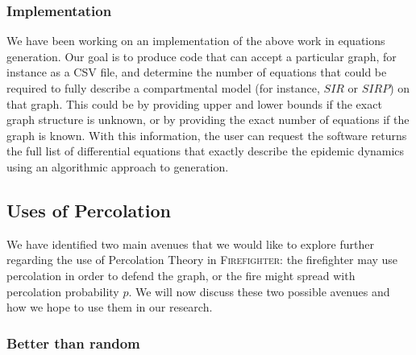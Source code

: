 \documentclass[../report.tex]{subfiles}
\begin{document}
\subsubsection{Implementation}
\label{subsubsec:implementation}

We have been working on an implementation of the above work in equations generation. Our goal is to produce code that can accept a particular graph, for instance as a CSV file, and determine the number of equations that could be required to fully describe a compartmental model (for instance, $SIR$ or $SIRP$) on that graph. This could be by providing upper and lower bounds if the exact graph structure is unknown, or by providing the exact number of equations if the graph is known. With this information, the user can request the software returns the full list of differential equations that exactly describe the epidemic dynamics using an algorithmic approach to generation.

\subsection{Uses of Percolation}
\label{subsec:perc-fire}

We have identified two main avenues that we would like to explore further regarding the use of Percolation Theory in {\scshape Firefighter}: the firefighter may use percolation in order to defend the graph, or the fire might spread with percolation probability $p$. We will now discuss these two possible avenues and how we hope to use them in our research.


\subsubsection{Better than random}
\end{document}
